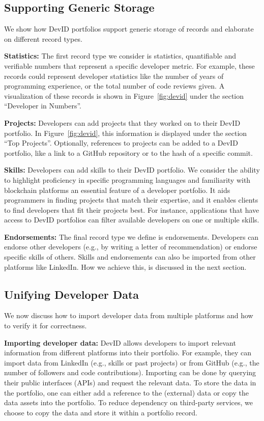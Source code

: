 \subsection{Supporting Generic Storage}
We show how DevID portfolios support generic storage of records and elaborate on different record types.

\textbf{Statistics:}
The first record type we consider is statistics, quantifiable and verifiable numbers that represent a specific developer metric.
For example, these records could represent developer statistics like the number of years of programming experience, or the total number of code reviews given.
A visualization of these records is shown in Figure~\ref{fig:devid} under the section \enquote{Developer in Numbers}.

\textbf{Projects:}
Developers can add projects that they worked on to their DevID portfolio.
In Figure~\ref{fig:devid}, this information is displayed under the section \enquote{Top Projects}.
Optionally, references to projects can be added to a DevID portfolio, like a link to a GitHub repository or to the hash of a specific commit.

\textbf{Skills:}
Developers can add skills to their DevID portfolio.
We consider the ability to highlight proficiency in specific programming languages and familiarity with blockchain platforms an essential feature of a developer portfolio.
It aids programmers in finding projects that match their expertise, and it enables clients to find developers that fit their projects best.
For instance, applications that have access to DevID portfolios can filter available developers on one or multiple skills.

\textbf{Endorsements:}
The final record type we define is endorsements.
Developers can endorse other developers (e.g., by writing a letter of recommendation) or endorse specific skills of others.
Skills and endorsements can also be imported from other platforms like LinkedIn.
How we achieve this, is discussed in the next section.

\subsection{Unifying Developer Data}
\label{subsec:unifying_data}
We now discuss how to import developer data from multiple platforms and how to verify it for correctness.

\textbf{Importing developer data:}
DevID allows developers to import relevant information from different platforms into their portfolio.
For example, they can import data from LinkedIn (e.g., skills or past projects) or from GitHub (e.g., the number of followers and code contributions).
Importing can be done by querying their public interfaces (APIs) and request the relevant data.
To store the data in the portfolio, one can either add a reference to the (external) data or copy the data assets into the portfolio.
To reduce dependency on third-party services, we choose to copy the data and store it within a portfolio record.

